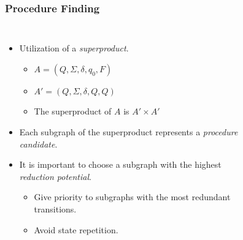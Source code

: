 \begin{frame}
  \frametitle{Procedure Finding}
  \begin{columns}
    \begin{itemize}
        \item Utilization of a \emph{superproduct}.
        \begin{itemize}
          \item $A = (Q, \Sigma, \delta, q_0, F)$
          \item $A' = (Q, \Sigma, \delta, Q, Q)$
          \item The superproduct of $A$ is $A' \times A'$
        \end{itemize}
        \vspace*{0.3em}
        \item<2-> Each subgraph of the superproduct represents a \emph{procedure candidate}.\justifying
        \vspace*{0.5em}
          \item<2-> It is important to choose a subgraph with the highest \emph{reduction potential}.\justifying
            \begin{itemize}
              \item<3-> Give priority to subgraphs with the most redundant transitions.\justifying
              \item<3-> Avoid state repetition.\justifying
            \end{itemize}
    \end{itemize}

      \vspace*{-1em}
      \begin{figure}[t]
        \centering
        \hspace*{-2.9em}
\end{figure}
\end{columns}
\end{frame}
